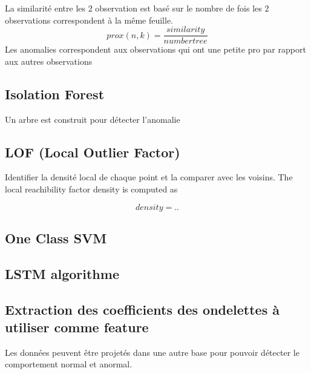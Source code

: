 La similarité entre les 2 observation est basé sur le nombre de fois les 2 observations
correspondent à la même feuille. 
\begin{equation}
prox(n,k)= \frac{similarity}{number tree}
\end{equation}
Les anomalies correspondent aux observations qui ont une petite pro par rapport aux autres observations 

\subsection{Isolation Forest}
Un arbre est construit pour détecter l'anomalie




\subsection{LOF (Local Outlier Factor)}
Identifier la densité local de chaque point et la comparer avec les voisins.
The local reachibility factor density is computed as

\begin{equation}
density  = ..
\end{equation}
\paragraph{}


\subsection{One Class SVM}


\subsection{LSTM algorithme}

\subsection{Extraction des coefficients des ondelettes à utiliser comme feature}
Les données peuvent être projetés dans une autre base pour pouvoir détecter le comportement normal et anormal.

